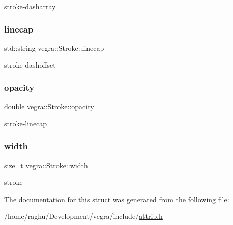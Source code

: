 stroke-\/dasharray 

\mbox{\label{structvegra_1_1Stroke_a67a29aa2a553bf490f8556dd526fcfcf}} 
\subsubsection{\texorpdfstring{linecap}{linecap}}
{\footnotesize\ttfamily std\+::string vegra\+::\+Stroke\+::linecap}



stroke-\/dashoffset 

\mbox{\label{structvegra_1_1Stroke_a1549534821eb8e96632f405af3c59d26}} 
\subsubsection{\texorpdfstring{opacity}{opacity}}
{\footnotesize\ttfamily double vegra\+::\+Stroke\+::opacity}



stroke-\/linecap 

\mbox{\label{structvegra_1_1Stroke_a95579e85bd704a94840674bbdee34304}} 
\subsubsection{\texorpdfstring{width}{width}}
{\footnotesize\ttfamily size\+\_\+t vegra\+::\+Stroke\+::width}



stroke 



The documentation for this struct was generated from the following file\+:\begin{DoxyCompactItemize}
\item 
/home/raghu/\+Development/vegra/include/\mbox{\hyperlink{attrib_8h}{attrib.\+h}}\end{DoxyCompactItemize}
